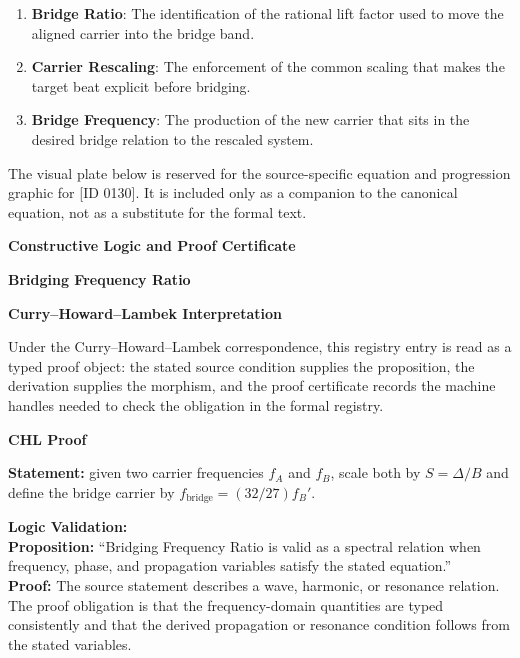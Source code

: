 \begin{enumerate}[leftmargin=1.6em,itemsep=6pt,topsep=4pt]
\item \textbf{Bridge Ratio}: The identification of the rational lift factor used to move the aligned carrier into the bridge band.
\item \textbf{Carrier Rescaling}: The enforcement of the common scaling that makes the target beat explicit before bridging.
\item \textbf{Bridge Frequency}: The production of the new carrier that sits in the desired bridge relation to the rescaled system.
\end{enumerate}

\begingroup\footnotesize\sloppy
The visual plate below is reserved for the source-specific equation and progression graphic for [ID 0130]. It is included only as a companion to the canonical equation, not as a substitute for the formal text.
\par\endgroup
\ifTZPDarkEdition
{}
\fi

\clearpage
\begingroup\tzpsupportsetup
\noindent\textbf{\fontsize{10.8pt}{12.8pt}\selectfont [ID 0130] Constructive Logic and Proof Certificate}\par
\noindent\textbf{\fontsize{10pt}{12pt}\selectfont Bridging Frequency Ratio}\par
\vspace{0.45em}
\begingroup
\footnotesize
\setlength{\parskip}{0.22em}
\setlength{\parindent}{0pt}
\noindent\textbf{Curry--Howard--Lambek Interpretation}\par
Under the Curry--Howard--Lambek correspondence, this registry entry is read as a typed proof
object: the stated source condition supplies the proposition, the derivation supplies the
morphism, and the proof certificate records the machine handles needed to check the obligation
in the formal registry.

\vspace{0.45em}
\noindent\textbf{CHL Proof}\par
\textbf{Statement:} given two carrier frequencies \(f_A\) and \(f_B\), scale both by
\(S=\Delta/B\) and define the bridge carrier by \(f_{\mathrm{bridge}}=(32/27)f_B'\).

\textbf{Logic Validation:}\\
\textbf{Proposition:} ``Bridging Frequency Ratio is valid as a spectral relation when frequency, phase, and
propagation variables satisfy the stated equation.''\\
\textbf{Proof:} The source statement describes a wave, harmonic, or resonance relation. The proof
obligation is that the frequency-domain quantities are typed consistently and that the
derived propagation or resonance condition follows from the stated variables.

